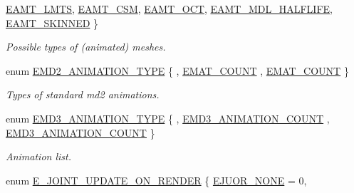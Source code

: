 \begin{DoxyCompactItemize}
\hyperlink{namespaceirr_1_1scene_a2fc85a64604521ca063f1881b5dd1c61a61c39e45ad6d3dded612220d81b1221e}{E\+A\+M\+T\+\_\+\+L\+M\+TS}, 
\newline
\hyperlink{namespaceirr_1_1scene_a2fc85a64604521ca063f1881b5dd1c61a0e2d98f60f7d1b930498d80c4dc4bce4}{E\+A\+M\+T\+\_\+\+C\+SM}, 
\hyperlink{namespaceirr_1_1scene_a2fc85a64604521ca063f1881b5dd1c61aa5ed61d08d512b0d08e372c3ba341cd4}{E\+A\+M\+T\+\_\+\+O\+CT}, 
\hyperlink{namespaceirr_1_1scene_a2fc85a64604521ca063f1881b5dd1c61a9c67a4cfcd21165e23e32f502aceb8b2}{E\+A\+M\+T\+\_\+\+M\+D\+L\+\_\+\+H\+A\+L\+F\+L\+I\+FE}, 
\hyperlink{namespaceirr_1_1scene_a2fc85a64604521ca063f1881b5dd1c61a9a9566728770f539eacc9291b20a243a}{E\+A\+M\+T\+\_\+\+S\+K\+I\+N\+N\+ED}
 \}\begin{DoxyCompactList}\small\item\em Possible types of (animated) meshes. \end{DoxyCompactList}
\item 
enum \hyperlink{namespaceirr_1_1scene_a08d4a84966e1d2886d0d57e4acbb4f19}{E\+M\+D2\+\_\+\+A\+N\+I\+M\+A\+T\+I\+O\+N\+\_\+\+T\+Y\+PE} \{ , \hyperlink{namespaceirr_1_1scene_a08d4a84966e1d2886d0d57e4acbb4f19abf12473333d2c8af36fe17e12167bba4}{E\+M\+A\+T\+\_\+\+C\+O\+U\+NT}
, \hyperlink{namespaceirr_1_1scene_a08d4a84966e1d2886d0d57e4acbb4f19abf12473333d2c8af36fe17e12167bba4}{E\+M\+A\+T\+\_\+\+C\+O\+U\+NT}
 \}\begin{DoxyCompactList}\small\item\em Types of standard md2 animations. \end{DoxyCompactList}
\item 
enum \hyperlink{namespaceirr_1_1scene_ac15a7915ea13336cdc38f1073888fcd3}{E\+M\+D3\+\_\+\+A\+N\+I\+M\+A\+T\+I\+O\+N\+\_\+\+T\+Y\+PE} \{ , \hyperlink{namespaceirr_1_1scene_ac15a7915ea13336cdc38f1073888fcd3a3973c8d21d2dc25b7aa0997644996f2d}{E\+M\+D3\+\_\+\+A\+N\+I\+M\+A\+T\+I\+O\+N\+\_\+\+C\+O\+U\+NT}
, \hyperlink{namespaceirr_1_1scene_ac15a7915ea13336cdc38f1073888fcd3a3973c8d21d2dc25b7aa0997644996f2d}{E\+M\+D3\+\_\+\+A\+N\+I\+M\+A\+T\+I\+O\+N\+\_\+\+C\+O\+U\+NT}
 \}\begin{DoxyCompactList}\small\item\em Animation list. \end{DoxyCompactList}
\item 
enum \hyperlink{namespaceirr_1_1scene_a4a36461b5fa197ca3c6636c043413fa5}{E\+\_\+\+J\+O\+I\+N\+T\+\_\+\+U\+P\+D\+A\+T\+E\+\_\+\+O\+N\+\_\+\+R\+E\+N\+D\+ER} \{ \newline
\hyperlink{namespaceirr_1_1scene_a4a36461b5fa197ca3c6636c043413fa5a3243978e1b4fbc919bbf3e5ea15aceb3}{E\+J\+U\+O\+R\+\_\+\+N\+O\+NE} = 0, 

\end{DoxyCompactItemize}
